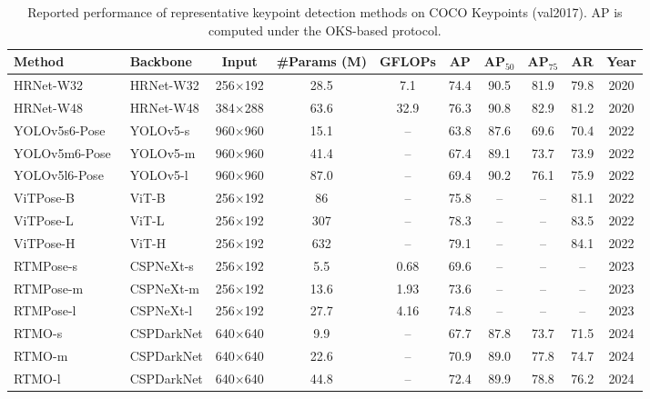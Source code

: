 \begin{table}[!t]
\centering
\caption{Reported performance of representative keypoint detection methods on COCO Keypoints (val2017). AP is computed under the OKS-based protocol.}
\label{tab:keypoint_coco_results}
\fontsize{9}{11}\selectfont
\setlength{\tabcolsep}{2.0mm}
\begin{tabular}{l l c c c c c c c c}
\toprule
\textbf{Method} & \textbf{Backbone} & \textbf{Input} & \textbf{\#Params (M)} & \textbf{GFLOPs} & \textbf{AP} & \textbf{AP$_{50}$} & \textbf{AP$_{75}$} & \textbf{AR} & \textbf{Year} \\
\midrule
HRNet-W32~\cite{wang2020deep}  & HRNet-W32   & 256$\times$192 & 28.5  & 7.1   & 74.4 & 90.5 & 81.9 & 79.8 & 2020 \\
HRNet-W48~\cite{wang2020deep}  & HRNet-W48   & 384$\times$288 & 63.6  & 32.9  & 76.3 & 90.8 & 82.9 & 81.2 & 2020 \\
YOLOv5s6-Pose~\cite{maji2022yolo} & YOLOv5-s   & 960$\times$960 & 15.1  & --  & 63.8 & 87.6 & 69.6 & 70.4 & 2022 \\
YOLOv5m6-Pose~\cite{maji2022yolo} & YOLOv5-m & 960$\times$960 & 41.4 & -- & 67.4 & 89.1 & 73.7 & 73.9 & 2022 \\
YOLOv5l6-Pose~\cite{maji2022yolo} & YOLOv5-l & 960$\times$960 & 87.0 & -- & 69.4 & 90.2 & 76.1 & 75.9 & 2022 \\
ViTPose-B~\cite{xu2022vitpose} & ViT-B       & 256$\times$192 & 86    & --  & 75.8 & -- & -- & 81.1 & 2022 \\
ViTPose-L~\cite{xu2022vitpose} & ViT-L       & 256$\times$192 & 307   & --  & 78.3 & -- & -- & 83.5 & 2022 \\
ViTPose-H~\cite{xu2022vitpose} & ViT-H       & 256$\times$192 & 632   & -- & 79.1 & -- & -- & 84.1 & 2022 \\
RTMPose-s~\cite{jiang2023rtmpose} & CSPNeXt-s & 256$\times$192 & 5.5  & 0.68  & 69.6 & -- & -- & -- & 2023 \\
RTMPose-m~\cite{jiang2023rtmpose} & CSPNeXt-m & 256$\times$192 & 13.6  & 1.93  & 73.6 & -- & -- & -- & 2023 \\
RTMPose-l~\cite{jiang2023rtmpose} & CSPNeXt-l & 256$\times$192 & 27.7  & 4.16  & 74.8 & -- & -- & -- & 2023 \\
RTMO-s~\cite{lu2024rtmo} & CSPDarkNet & 640$\times$640 & 9.9 & -- & 67.7 & 87.8 & 73.7 & 71.5 & 2024 \\
RTMO-m~\cite{lu2024rtmo} & CSPDarkNet & 640$\times$640 & 22.6 & -- & 70.9 & 89.0 & 77.8 & 74.7 & 2024 \\
RTMO-l~\cite{lu2024rtmo} & CSPDarkNet & 640$\times$640 & 44.8 & -- & 72.4 & 89.9 & 78.8 & 76.2 & 2024 \\
\bottomrule
\end{tabular}
\end{table}

